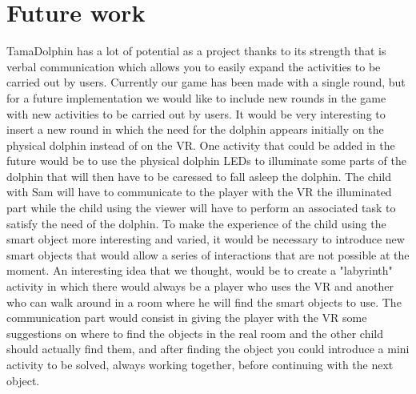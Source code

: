 \documentclass [12pt]{article}
\begin{document}
\section{Future work}
TamaDolphin has a lot of potential as a project thanks to its strength that is verbal communication which allows you to easily expand the activities to be carried out by users. Currently our game has been made with a single round, but for a future implementation we would like to include new rounds in the game with new activities to be carried out by users. It would be very interesting to insert a new round in which the need for the dolphin appears initially on the physical dolphin instead of on the VR.
One activity that could be added in the future would be to use the physical dolphin LEDs to illuminate some parts of the dolphin that will then have to be caressed to fall asleep the dolphin. 
The child with Sam will have to communicate to the player with the VR the illuminated part while the child using the viewer will have to perform an associated task to satisfy the need of the dolphin.
To make the experience of the child using the smart object more interesting and varied, it would be necessary to introduce new smart objects that would allow a series of interactions that are not possible at the moment. An interesting idea that we thought, would be to create a "labyrinth" activity in which there would always be a player who uses the VR and another who can walk around in a room where he will find the smart objects to use. The communication part would consist in giving the player with the VR some suggestions on where to find the objects in the real room and the other child should actually find them, and after finding the object you could introduce a mini activity to be solved, always working together, before continuing with the next object.
\end{document}
